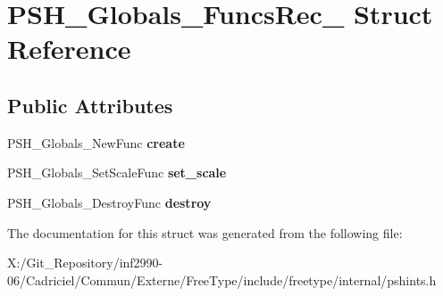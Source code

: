 \hypertarget{struct_p_s_h___globals___funcs_rec__}{\section{P\-S\-H\-\_\-\-Globals\-\_\-\-Funcs\-Rec\-\_\- Struct Reference}
\label{struct_p_s_h___globals___funcs_rec__}
}
\subsection*{Public Attributes}
\begin{DoxyCompactItemize}
\item 
\hypertarget{struct_p_s_h___globals___funcs_rec___ac136cec55ea33a2e3b60ffdad20f5420}{P\-S\-H\-\_\-\-Globals\-\_\-\-New\-Func {\bfseries create}}\label{struct_p_s_h___globals___funcs_rec___ac136cec55ea33a2e3b60ffdad20f5420}

\item 
\hypertarget{struct_p_s_h___globals___funcs_rec___a9c97456d3f521cb1091f08c2bda27332}{P\-S\-H\-\_\-\-Globals\-\_\-\-Set\-Scale\-Func {\bfseries set\-\_\-scale}}\label{struct_p_s_h___globals___funcs_rec___a9c97456d3f521cb1091f08c2bda27332}

\item 
\hypertarget{struct_p_s_h___globals___funcs_rec___aebb5534f8305a189b09adfebff4f57ba}{P\-S\-H\-\_\-\-Globals\-\_\-\-Destroy\-Func {\bfseries destroy}}\label{struct_p_s_h___globals___funcs_rec___aebb5534f8305a189b09adfebff4f57ba}

\end{DoxyCompactItemize}


The documentation for this struct was generated from the following file\-:\begin{DoxyCompactItemize}
\item 
X\-:/\-Git\-\_\-\-Repository/inf2990-\/06/\-Cadriciel/\-Commun/\-Externe/\-Free\-Type/include/freetype/internal/pshints.\-h\end{DoxyCompactItemize}
